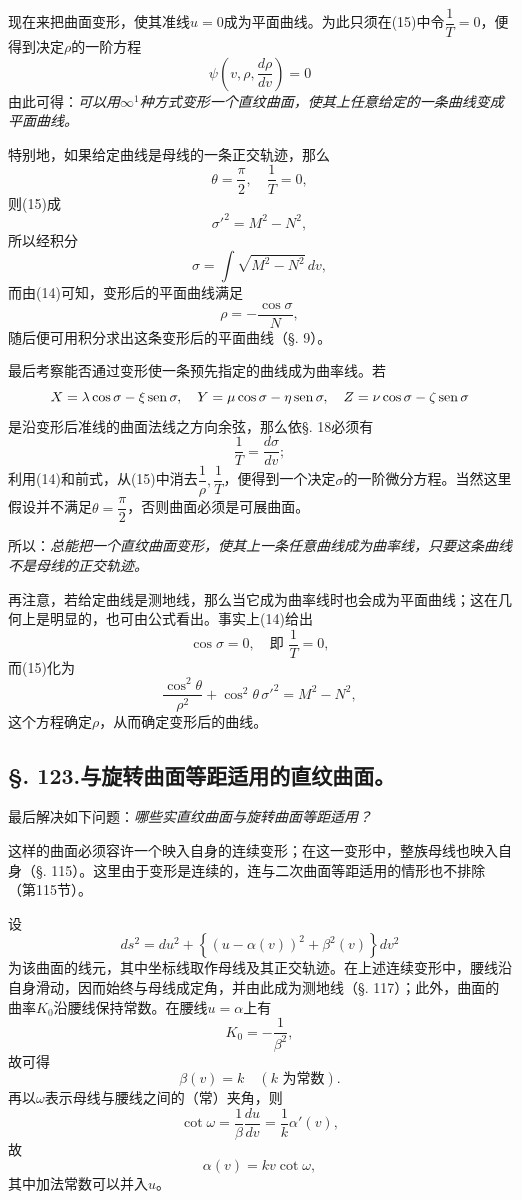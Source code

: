 现在来把曲面变形，使其准线\(u=0\)成为平面曲线。为此只须在(15)中令\(\dfrac1T=0\)，便得到决定\(\rho\)的一阶方程
\[
 \psi\left(v,\rho,\frac{d\rho}{dv}\right)=0
\]
由此可得：\emph{可以用\(\infty^1\)种方式变形一个直纹曲面，使其上任意给定的一条曲线变成平面曲线。}

特别地，如果给定曲线是母线的一条正交轨迹，那么
\[
 \theta=\frac\pi2,
 \quad \frac1T=0,
\]
则(15)成
\[
 \sigma'^2=M^2-N^2,
\]
所以经积分
\[
 \sigma=\int\sqrt{M^2-N^2}\,dv,
\]
而由(14)可知，变形后的平面曲线满足
\[
 \rho=-\frac{\cos\sigma}{N},
\]
随后便可用积分求出这条变形后的平面曲线（\S. 9）。

最后考察能否通过变形使一条预先指定的曲线成为曲率线。若
\[
 X=\lambda\cos\sigma-\xi\operatorname{sen}\sigma,
 \quad Y=\mu\cos\sigma-\eta\operatorname{sen}\sigma,
 \quad Z=\nu\cos\sigma-\zeta\operatorname{sen}\sigma
\]
是沿变形后准线的曲面法线之方向余弦，那么依\S. 18必须有
\[
 \frac1T=\frac{d\sigma}{dv};
\]
利用(14)和前式，从(15)中消去\(\dfrac1\rho,\dfrac1T\)，便得到一个决定\(\sigma\)的一阶微分方程。当然这里假设并不满足\(\theta=\dfrac\pi2\)，否则曲面必须是可展曲面。

所以：\emph{总能把一个直纹曲面变形，使其上一条任意曲线成为曲率线，只要这条曲线不是母线的正交轨迹。}

再注意，若给定曲线是测地线，那么当它成为曲率线时也会成为平面曲线；这在几何上是明显的，也可由公式看出。事实上(14)给出
\[
 \cos\sigma=0,\quad \text{即 } \frac1T=0,
\]
而(15)化为
\[
 \frac{\cos^2\theta}{\rho^2}+\cos^2\theta\,\sigma'^2=M^2-N^2,
\]
这个方程确定\(\rho\)，从而确定变形后的曲线。

\subsection*{\S. 123.\quad 与旋转曲面等距适用的直纹曲面。}

最后解决如下问题：\emph{哪些实直纹曲面与旋转曲面等距适用？}

这样的曲面必须容许一个映入自身的连续变形；在这一变形中，整族母线也映入自身（\S. 115）。这里由于变形是连续的，连与二次曲面等距适用的情形也不排除（第115节）。

设
\[
 ds^2=du^2+\left\{(u-\alpha(v))^2+\beta^2(v)\right\}dv^2
\]
为该曲面的线元，其中坐标线取作母线及其正交轨迹。在上述连续变形中，腰线沿自身滑动，因而始终与母线成定角，并由此成为测地线（\S. 117）；此外，曲面的曲率\(K_0\)沿腰线保持常数。在腰线\(u=\alpha\)上有
\[
 K_0=-\frac1{\beta^2},
\]
故可得
\[
 \beta(v)=k\quad (k\text{ 为常数}).
\]
再以\(\omega\)表示母线与腰线之间的（常）夹角，则
\[
 \cot\omega=\frac1\beta\frac{du}{dv}=\frac1k\alpha'(v),
\]
故
\[
 \alpha(v)=kv\cot\omega,
\]
其中加法常数可以并入\(u\)。

